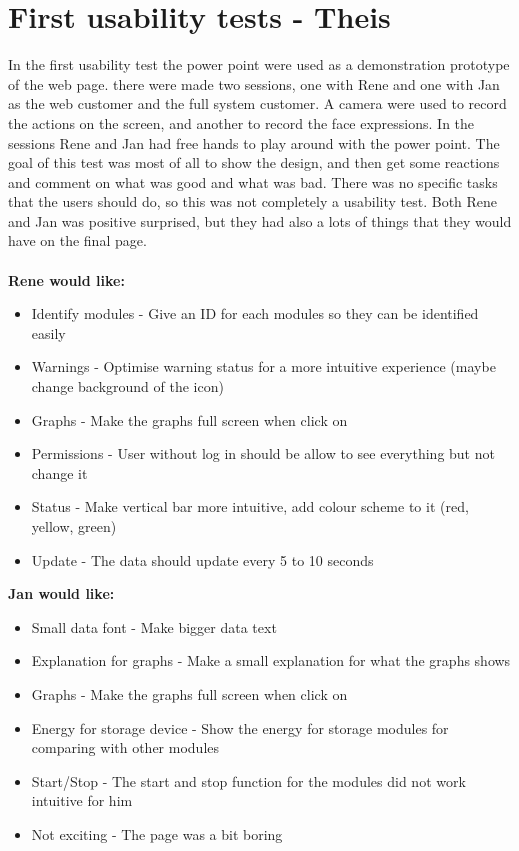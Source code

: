 \section{First usability tests - Theis}
In the first usability test the power point were used as a demonstration prototype of the web page. there were made two sessions, one with Rene and one with Jan as the web customer and the full system customer. A camera were used to record the actions on the screen, and another to record the face expressions. In the sessions Rene and Jan had free hands to play around with the power point. The goal of this test was most of all to show the design, and then get some reactions and comment on what was good and what was bad. There was no specific tasks that the users should do, so this was not completely a usability test. Both Rene and Jan was positive surprised, but they had also a lots of things that they would have on the final page.\\\\
\textbf{Rene would like:}
\begin{itemize}
	\item Identify modules - Give an ID for each modules so they can be identified easily
	\item Warnings - Optimise warning status for a more intuitive experience (maybe change background of the icon)
	\item Graphs - Make the graphs full screen when click on
	\item Permissions - User without log in should be allow to see everything but not change it
	\item Status - Make vertical bar more intuitive, add colour scheme to it (red, yellow, green)
	\item Update - The data should update every 5 to 10 seconds
\end{itemize}
\textbf{Jan would like:}
\begin{itemize}
	\item Small data font - Make bigger data text
	\item Explanation for graphs - Make a small explanation for what the graphs shows
	\item Graphs - Make the graphs full screen when click on
	\item Energy for storage device - Show the energy for storage modules for comparing with other modules
	\item Start/Stop - The start and stop function for the modules did not work intuitive for him
	\item Not exciting - The page was a bit boring
\end{itemize}
